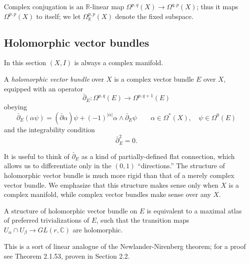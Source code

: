 \documentclass[12pt,letterpaper,reqno]{article}
\numberwithin{equation}{section}
\newcommand{\R}{\ensuremath{\mathbb R}}
\newcommand{\C}{\ensuremath{\mathbb C}}
\newcommand{\abs}[1]{\lvert#1\rvert}
\newcommand{\ti}[1]{\textit{#1}}
\begin{document}
Complex conjugation is an $\R$-linear map
$\Omega^{p,q}(X) \to \Omega^{q,p}(X)$;
thus it maps $\Omega^{p,p}(X)$ to itself;
we let $\Omega_\R^{p,p}(X)$ denote the fixed subspace.

\subsection{Holomorphic vector bundles}

In this section $(X,I)$ is always a complex manifold.

\begin{defn} A \ti{holomorphic vector bundle} over $X$ is a complex vector bundle $E$ over $X$, equipped with an operator
\begin{equation}
  \bar\partial_E :  \Omega^{p,q}(E) \to \Omega^{p,q+1}(E)
\end{equation}
obeying
\begin{equation}
  \bar\partial_E (\alpha \psi) = (\bar\partial \alpha) \psi + (-1)^{\abs{\alpha}} \alpha \wedge \bar\partial_E \psi \qquad \alpha \in \Omega^*(X), \quad \psi \in \Omega^0(E)
\end{equation}
and the integrability condition
\begin{equation}
  \bar\partial_E^2 = 0.
\end{equation}
\end{defn}

It is useful to think of $\bar\partial_E$ as a kind of
partially-defined flat connection, which allows us to differentiate
only in the $(0,1)$ ``directions.''
The structure of holomorphic vector bundle is much
more rigid than that of a merely complex vector bundle.
We emphasize that this structure makes sense only when $X$ is
a complex manifold, while complex vector bundles make sense
over any $X$.

\begin{prop} A structure of holomorphic vector bundle on $E$ is equivalent to a maximal atlas
of preferred trivializations of $E$, such that
the transition maps
$U_\alpha \cap U_\beta \to GL(r,\C)$
are holomorphic.
\end{prop}
\begin{pf}
This is a sort of linear analogue of the
Newlander-Nirenberg theorem; for a proof see
\cite{MR1079726} Theorem 2.1.53, proven in Section 2.2.
\end{pf}

\end{document}
